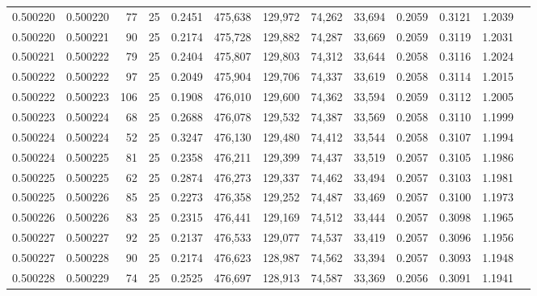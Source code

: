 \begin{tabular}{rrrrrrrrrrrrr}
0.500220 & 0.500220 &  77 &  25 &                                     0.2451 & 475,638 & 129,972 &  74,262 &  33,694 & 0.2059 & 0.3121 & 1.2039 \\
0.500220 & 0.500221 &  90 &  25 &                                     0.2174 & 475,728 & 129,882 &  74,287 &  33,669 & 0.2059 & 0.3119 & 1.2031 \\
0.500221 & 0.500222 &  79 &  25 &                                     0.2404 & 475,807 & 129,803 &  74,312 &  33,644 & 0.2058 & 0.3116 & 1.2024 \\
0.500222 & 0.500222 &  97 &  25 &                                     0.2049 & 475,904 & 129,706 &  74,337 &  33,619 & 0.2058 & 0.3114 & 1.2015 \\
0.500222 & 0.500223 & 106 &  25 &                                     0.1908 & 476,010 & 129,600 &  74,362 &  33,594 & 0.2059 & 0.3112 & 1.2005 \\
0.500223 & 0.500224 &  68 &  25 &                                     0.2688 & 476,078 & 129,532 &  74,387 &  33,569 & 0.2058 & 0.3110 & 1.1999 \\
0.500224 & 0.500224 &  52 &  25 &                                     0.3247 & 476,130 & 129,480 &  74,412 &  33,544 & 0.2058 & 0.3107 & 1.1994 \\
0.500224 & 0.500225 &  81 &  25 &                                     0.2358 & 476,211 & 129,399 &  74,437 &  33,519 & 0.2057 & 0.3105 & 1.1986 \\
0.500225 & 0.500225 &  62 &  25 &                                     0.2874 & 476,273 & 129,337 &  74,462 &  33,494 & 0.2057 & 0.3103 & 1.1981 \\
0.500225 & 0.500226 &  85 &  25 &                                     0.2273 & 476,358 & 129,252 &  74,487 &  33,469 & 0.2057 & 0.3100 & 1.1973 \\
0.500226 & 0.500226 &  83 &  25 &                                     0.2315 & 476,441 & 129,169 &  74,512 &  33,444 & 0.2057 & 0.3098 & 1.1965 \\
0.500227 & 0.500227 &  92 &  25 &                                     0.2137 & 476,533 & 129,077 &  74,537 &  33,419 & 0.2057 & 0.3096 & 1.1956 \\
0.500227 & 0.500228 &  90 &  25 &                                     0.2174 & 476,623 & 128,987 &  74,562 &  33,394 & 0.2057 & 0.3093 & 1.1948 \\
0.500228 & 0.500229 &  74 &  25 &                                     0.2525 & 476,697 & 128,913 &  74,587 &  33,369 & 0.2056 & 0.3091 & 1.1941 \\

\end{tabular}
